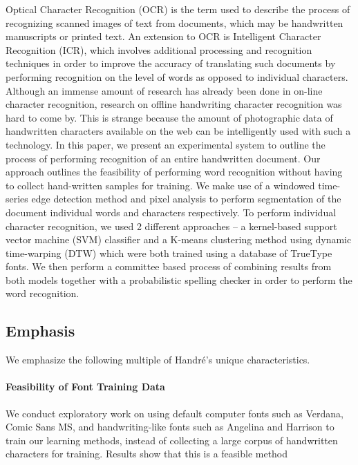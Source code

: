 \documentclass[12pt]{article}
\begin{document}
	Optical Character Recognition (OCR) is the term used to describe the process of recognizing scanned images of text from documents, which may be handwritten manuscripts or printed text. An extension to OCR is Intelligent Character Recognition (ICR), which involves additional processing and recognition techniques in order to improve the accuracy of translating such documents by performing recognition on the level of words as opposed to individual characters. Although an immense amount of research has already been done in on-line character recognition\cite{Jianying, Tappert, Bahlmann, Tanaka, Yuan}, research on offline handwriting character recognition was hard to come by. This is strange because the amount of photographic data of handwritten characters available on the web can be intelligently used with such a technology. In this paper, we present an experimental system to outline the process of performing recognition of an entire handwritten document. Our approach outlines the feasibility of performing word recognition without having to collect hand-written samples for training. We make use of a windowed time-series edge detection method and pixel analysis to perform segmentation of the document individual words and characters respectively. To perform individual character recognition, we used 2 different approaches -- a kernel-based support vector machine (SVM) classifier and a K-means clustering method \cite{hartigan1979algorithm} using dynamic time-warping (DTW) \cite{Berndt_Clifford_1994} which were both trained using a database of TrueType fonts. We then perform a committee based process of combining results from both models together with a probabilistic spelling checker in order to perform the word recognition. 

\subsection{Emphasis}
	We emphasize the following multiple of Handr\'{e}'s unique characteristics.
	
	\paragraph{Feasibility of Font Training Data} We conduct exploratory work on using default computer fonts such as Verdana, Comic Sans MS, and handwriting-like fonts such as Angelina and Harrison to train our learning methods, instead of collecting a large corpus of handwritten characters for training. Results show that this is a feasible method
	
\end{document}
